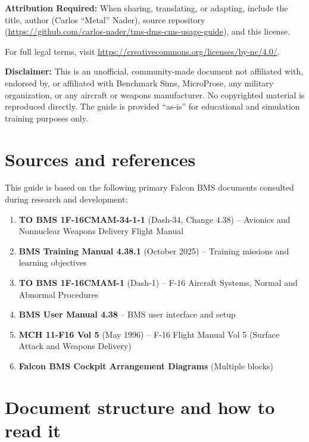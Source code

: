 \documentclass[11pt, a4paper, twoside]{report}
\begin{document}
\textbf{Attribution Required:} When sharing, translating, or adapting, include the title, author (Carlos ``Metal'' Nader), source repository (\url{https://github.com/carlos-nader/tms-dms-cms-usage-guide}), and this license.

For full legal terms, visit \url{https://creativecommons.org/licenses/by-nc/4.0/}.

\textbf{Disclaimer:} This is an unofficial, community-made document not affiliated with, endorsed by, or affiliated with Benchmark Sims, MicroProse, any military organization, or any aircraft or weapons manufacturer. No copyrighted material is reproduced directly. The guide is provided ``as-is'' for educational and simulation training purposes only.

\section{Sources and references}
\label{sec:C1-S4}

This guide is based on the following primary Falcon BMS documents consulted during research and development:

\begin{enumerate}
  \item \textbf{TO BMS 1F-16CMAM-34-1-1} (Dash-34, Change 4.38) -- Avionics and Nonnuclear Weapons Delivery Flight Manual
  \item \textbf{BMS Training Manual 4.38.1} (October 2025) -- Training missions and learning objectives
  \item \textbf{TO BMS 1F-16CMAM-1} (Dash-1) -- F-16 Aircraft Systems, Normal and Abnormal Procedures
  \item \textbf{BMS User Manual 4.38} -- BMS user interface and setup
  \item \textbf{MCH 11-F16 Vol 5} (May 1996) -- F-16 Flight Manual Vol 5 (Surface Attack and Weapons Delivery)
  \item \textbf{Falcon BMS Cockpit Arrangement Diagrams} (Multiple blocks)
\end{enumerate}

\section{Document structure and how to read it}
\label{sec:C1-S5}
\end{document}
